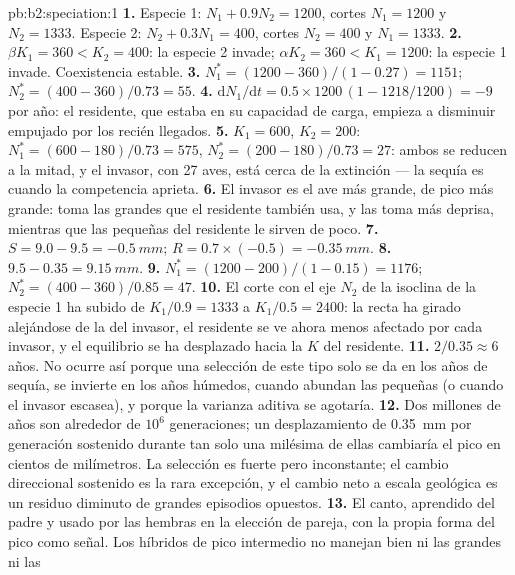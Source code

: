 \begin{solution}{pb:b2:speciation:1}
\textbf{1.} Especie 1: $N_1 + 0.9N_2 = 1200$, cortes $N_1 = 1200$
y $N_2 = 1333$. Especie 2: $N_2 + 0.3N_1 = 400$, cortes $N_2 =
400$ y $N_1 = 1333$.
\textbf{2.} $\beta K_1 = 360 < K_2 = 400$: la especie 2 invade;
$\alpha K_2 = 360 < K_1 = 1200$: la especie 1 invade. Coexistencia
estable.
\textbf{3.} $N_1^{*} = (1200 - 360)/(1 - 0.27) = 1151$; $N_2^{*} =
(400 - 360)/0.73 = 55$.
\textbf{4.} $\mathrm{d}N_1/\mathrm{d}t = 0.5\times 1200\,(1 - 1218/1200)
= -9$ por año: el residente, que estaba en su capacidad de carga, empieza a
disminuir empujado por los recién llegados.
\textbf{5.} $K_1 = 600$, $K_2 = 200$: $N_1^{*} = (600 - 180)/0.73 =
575$, $N_2^{*} = (200 - 180)/0.73 = 27$: ambos se reducen a la mitad, y el
invasor, con 27 aves, está cerca de la extinción --- la sequía es cuando
la competencia aprieta.
\textbf{6.} El invasor es el ave más grande, de pico más grande: toma las
 grandes que el residente también usa, y las toma más deprisa,
mientras que las  pequeñas del residente le sirven de poco.
\textbf{7.} $S = 9.0 - 9.5 = \qty{-0.5}{mm}$; $R = 0.7\times(-0.5) =
\qty{-0.35}{mm}$.
\textbf{8.} $9.5 - 0.35 = \qty{9.15}{mm}$.
\textbf{9.} $N_1^{*} = (1200 - 200)/(1 - 0.15) = 1176$; $N_2^{*} =
(400 - 360)/0.85 = 47$.
\textbf{10.} El corte con el eje $N_2$ de la isoclina de la especie 1 ha
subido de
$K_1/0.9 = 1333$ a $K_1/0.5 = 2400$: la recta ha girado alejándose de la
del invasor, el residente se ve ahora menos afectado por cada invasor, y el
equilibrio se ha desplazado hacia la $K$ del residente.
\textbf{11.} $2/0.35 \approx 6$ años. No ocurre así porque una selección de
este tipo solo se da en los años de sequía, se invierte en los años húmedos,
cuando abundan las  pequeñas (o cuando el invasor escasea), y
porque la varianza aditiva se agotaría.
\textbf{12.} Dos millones de años son alrededor de $10^{6}$ generaciones;
un desplazamiento de \qty{0.35}{mm} por generación sostenido durante tan
solo una milésima de ellas cambiaría el pico en cientos de milímetros. La
selección es fuerte pero inconstante; el cambio direccional sostenido es
la rara excepción, y el cambio neto a escala geológica es un residuo
diminuto de grandes episodios opuestos.
\textbf{13.} El canto, aprendido del padre y usado por las hembras en la
elección de pareja, con la propia forma del pico como señal. Los híbridos
de pico intermedio no manejan bien ni las  grandes ni las

\end{solution}
